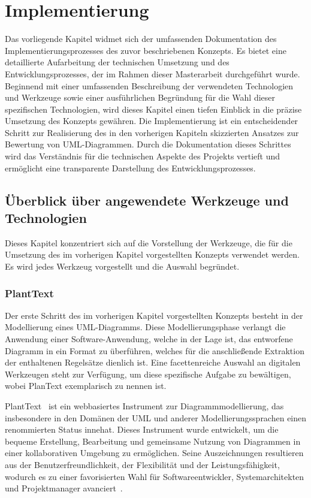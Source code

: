 \chapter{Implementierung}

Das vorliegende Kapitel widmet sich der umfassenden Dokumentation des Implementierungsprozesses des zuvor beschriebenen
Konzepts. Es bietet eine detaillierte Aufarbeitung der technischen Umsetzung und des Entwicklungsprozesses, der im
Rahmen dieser Masterarbeit durchgeführt wurde. Beginnend mit einer umfassenden Beschreibung der verwendeten Technologien
und Werkzeuge sowie einer ausführlichen Begründung für die Wahl dieser spezifischen Technologien, wird dieses Kapitel
einen tiefen Einblick in die präzise Umsetzung des Konzepts gewähren. Die Implementierung ist ein entscheidender Schritt
zur Realisierung des in den vorherigen Kapiteln skizzierten Ansatzes zur Bewertung von UML-Diagrammen. Durch die
Dokumentation dieses Schrittes wird das Verständnis für die technischen Aspekte des Projekts vertieft und ermöglicht
eine transparente Darstellung des Entwicklungsprozesses.

\section{Überblick über angewendete Werkzeuge und Technologien}
Dieses Kapitel konzentriert sich auf die Vorstellung der Werkzeuge, die für die Umsetzung des im vorherigen Kapitel
vorgestellten Konzepts verwendet werden. Es wird jedes Werkzeug vorgestellt und die Auswahl begründet.

\subsection{PlantText}

Der erste Schritt des im vorherigen Kapitel vorgestellten Konzepts besteht in der Modellierung eines UML-Diagramms.
Diese Modellierungsphase verlangt die Anwendung einer Software-Anwendung, welche in der Lage ist, das entworfene
Diagramm in ein Format zu überführen, welches für die anschließende Extraktion der enthaltenen Regelsätze dienlich
ist. Eine facettenreiche Auswahl an digitalen Werkzeugen steht zur Verfügung, um diese spezifische Aufgabe zu
bewältigen, wobei PlanText exemplarisch zu nennen ist.

PlantText~\cite{planttext} ist ein webbasiertes Instrument zur Diagrammmodellierung, das insbesondere in den Domänen
der UML und anderer Modellierungssprachen einen renommierten Status innehat. Dieses Instrument wurde entwickelt,
um die bequeme Erstellung, Bearbeitung und gemeinsame Nutzung von Diagrammen in einer kollaborativen Umgebung zu
ermöglichen. Seine Auszeichnungen resultieren aus der Benutzerfreundlichkeit, der Flexibilität und der
Leistungsfähigkeit, wodurch es zu einer favorisierten Wahl für Softwareentwickler, Systemarchitekten und Projektmanager
avanciert~\cite{planttext}.

